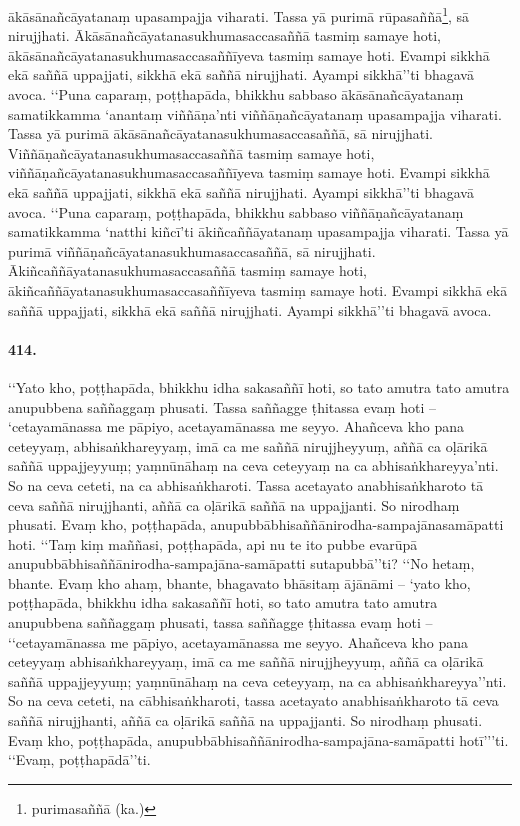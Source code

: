 ākāsānañcāyatanaṃ upasampajja viharati. Tassa yā purimā rūpasaññā\footnote{purimasaññā (ka.)}, sā nirujjhati. Ākāsānañcāyatanasukhumasaccasaññā tasmiṃ samaye hoti, ākāsānañcāyatanasukhumasaccasaññīyeva tasmiṃ samaye hoti. Evampi sikkhā ekā saññā uppajjati, sikkhā ekā saññā nirujjhati. Ayampi sikkhā’’ti bhagavā avoca. ‘‘Puna caparaṃ, poṭṭhapāda, bhikkhu sabbaso ākāsānañcāyatanaṃ samatikkamma ‘anantaṃ viññāṇa’nti viññāṇañcāyatanaṃ upasampajja viharati. Tassa yā purimā ākāsānañcāyatanasukhumasaccasaññā, sā nirujjhati. Viññāṇañcāyatanasukhumasaccasaññā tasmiṃ samaye hoti, viññāṇañcāyatanasukhumasaccasaññīyeva tasmiṃ samaye hoti. Evampi sikkhā ekā saññā uppajjati, sikkhā ekā saññā nirujjhati. Ayampi sikkhā’’ti bhagavā avoca. ‘‘Puna caparaṃ, poṭṭhapāda, bhikkhu sabbaso viññāṇañcāyatanaṃ samatikkamma ‘natthi kiñcī’ti ākiñcaññāyatanaṃ upasampajja viharati. Tassa yā purimā viññāṇañcāyatanasukhumasaccasaññā, sā nirujjhati. Ākiñcaññāyatanasukhumasaccasaññā tasmiṃ samaye hoti, ākiñcaññāyatanasukhumasaccasaññīyeva tasmiṃ samaye hoti. Evampi sikkhā ekā saññā uppajjati, sikkhā ekā saññā nirujjhati. Ayampi sikkhā’’ti bhagavā avoca.

\paragraph{414.} ‘‘Yato kho, poṭṭhapāda, bhikkhu idha sakasaññī hoti, so tato amutra tato amutra anupubbena saññaggaṃ phusati. Tassa saññagge ṭhitassa evaṃ hoti – ‘cetayamānassa me pāpiyo, acetayamānassa me seyyo. Ahañceva kho pana ceteyyaṃ, abhisaṅkhareyyaṃ, imā ca me saññā nirujjheyyuṃ, aññā ca oḷārikā saññā uppajjeyyuṃ; yaṃnūnāhaṃ na ceva ceteyyaṃ na ca abhisaṅkhareyya’nti. So na ceva ceteti, na ca abhisaṅkharoti. Tassa acetayato anabhisaṅkharoto tā ceva saññā nirujjhanti, aññā ca oḷārikā saññā na uppajjanti. So nirodhaṃ phusati. Evaṃ kho, poṭṭhapāda, anupubbābhisaññānirodha-sampajānasamāpatti hoti. ‘‘Taṃ kiṃ maññasi, poṭṭhapāda, api nu te ito pubbe evarūpā anupubbābhisaññānirodha-sampajāna-samāpatti sutapubbā’’ti? ‘‘No hetaṃ, bhante. Evaṃ kho ahaṃ, bhante, bhagavato bhāsitaṃ ājānāmi – ‘yato kho, poṭṭhapāda, bhikkhu idha sakasaññī hoti, so tato amutra tato amutra anupubbena saññaggaṃ phusati, tassa saññagge ṭhitassa evaṃ hoti – ‘‘cetayamānassa me pāpiyo, acetayamānassa me seyyo. Ahañceva kho pana ceteyyaṃ abhisaṅkhareyyaṃ, imā ca me saññā nirujjheyyuṃ, aññā ca oḷārikā saññā uppajjeyyuṃ; yaṃnūnāhaṃ na ceva ceteyyaṃ, na ca abhisaṅkhareyya’’nti. So na ceva ceteti, na cābhisaṅkharoti, tassa acetayato anabhisaṅkharoto tā ceva saññā nirujjhanti, aññā ca oḷārikā saññā na uppajjanti. So nirodhaṃ phusati. Evaṃ kho, poṭṭhapāda, anupubbābhisaññānirodha-sampajāna-samāpatti hotī’’’ti. ‘‘Evaṃ, poṭṭhapādā’’ti.

